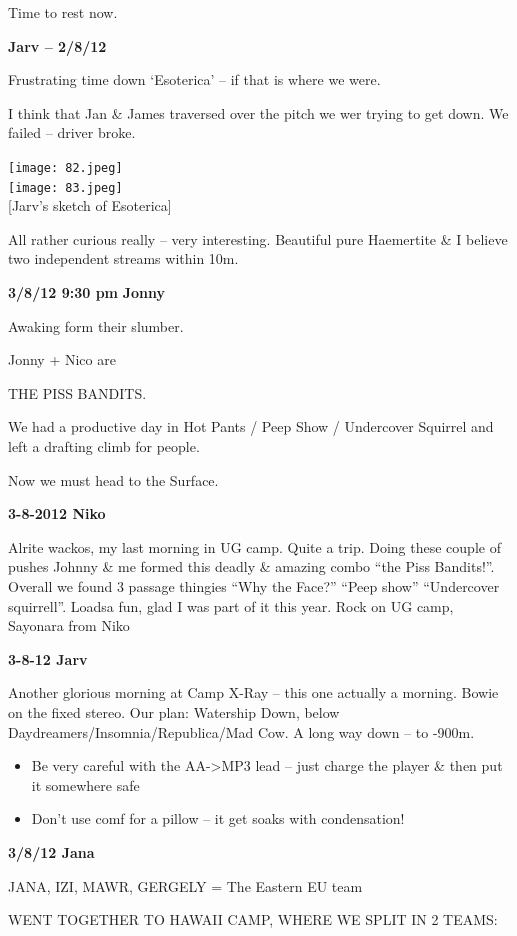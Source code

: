 Time to rest now.

\textbf{Jarv -- 2/8/12}

Frustrating time down `Esoterica' -- if that is where we were.

I think that Jan \& James traversed over the pitch we wer trying to get
down. We failed -- driver broke.

\texttt{[image: 82.jpeg]}\\
\texttt{[image: 83.jpeg]}\\
{[}Jarv's sketch of Esoterica{]}

All rather curious really -- very interesting. Beautiful pure Haemertite
\& I believe two independent streams within 10m.

\textbf{3/8/12 9:30 pm} \textbf{Jonny}

Awaking form their slumber.

Jonny + Nico are

THE PISS BANDITS.

We had a productive day in Hot Pants / Peep Show / Undercover Squirrel
and left a drafting climb for people.

Now we must head to the Surface.

\textbf{3-8-2012 Niko}

Alrite wackos, my last morning in UG camp. Quite a trip. Doing these
couple of pushes Johnny \& me formed this deadly \& amazing combo ``the
Piss Bandits!''. Overall we found 3 passage thingies ``Why the Face?''
``Peep show'' ``Undercover squirrell''. Loadsa fun, glad I was part of
it this year. Rock on UG camp, Sayonara from Niko

\textbf{3-8-12 Jarv}

Another glorious morning at Camp X-Ray -- this one actually a morning.
Bowie on the fixed stereo. Our plan: Watership Down, below
Daydreamers/Insomnia/Republica/Mad Cow. A long way down -- to -900m.

\begin{itemize}
\tightlist
\item
  Be very careful with the AA-\textgreater{}MP3 lead -- just charge the
  player \& then put it somewhere safe
\item
  Don't use comf for a pillow -- it get soaks with condensation!
\end{itemize}

\textbf{3/8/12 Jana}

JANA, IZI, MAWR, GERGELY = The Eastern EU team

WENT TOGETHER TO HAWAII CAMP, WHERE WE SPLIT IN 2 TEAMS:

